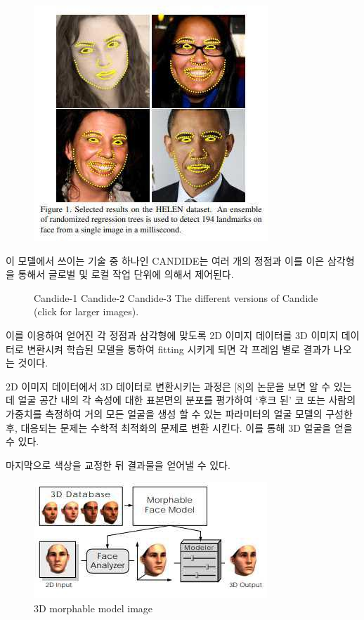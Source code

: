 \documentclass{oblivoir}
\begin{document}
\begin{figure}[h!]
  \centering
    \includegraphics{pic/chp2/img684}
  \caption{\cite{reference7}}
\end{figure}



이 모델에서 쓰이는 기술 중 하나인 CANDIDE는 여러 개의 정점과 이를 이은 삼각형을 통해서 글로벌 및 로컬 작업 단위에 의해서 제어된다.


\begin{figure}[h!]
\centering
\caption{ 
Candide-1
Candide-2
Candide-3
The different versions of Candide (click for larger images).}
\end{figure}


이를 이용하여 얻어진 각 정점과 삼각형에 맞도록 2D 이미지 데이터를 3D 이미지 데이터로 변환시켜 학습된 모델을 통하여 fitting 시키게 되면 각 프레임 별로 결과가 나오는 것이다.

2D 이미지 데이터에서 3D 데이터로 변환시키는 과정은 [8]의 논문을 보면 알 수 있는데 
얼굴 공간 내의 각 속성에 대한 표본면의 분포를 평가하여 ‘후크 된’ 코 또는 사람의 가중치를 측정하여 거의 모든 얼굴을 생성 할 수 있는 파라미터의 얼굴 모델의 구성한 후, 대응되는 문제는 수학적 최적화의 문제로 변환 시킨다. 이를 통해 3D 얼굴을 얻을 수 있다.

마지막으로 색상을 교정한 뒤 결과물을 얻어낼 수 있다.

\begin{figure}[h!]
  \centering
    \includegraphics{pic/chp2/img712}
  \caption{ 3D morphable model image\cite{reference7}}
\end{figure}
\end{document}
